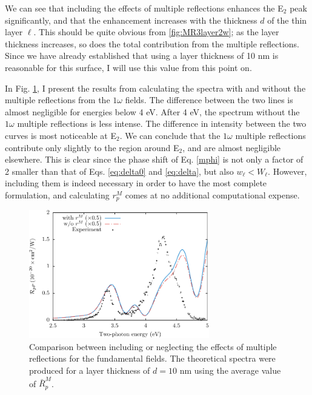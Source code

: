We can see that including the effects of multiple reflections enhances the
E$_{2}$ peak significantly, and that the enhancement increases with the
thickness $d$ of the thin layer $\ell$. This should be quite obvious from
\ref{fig:MR3layer2w}; as the layer thickness increases, so does the total
contribution from the multiple reflections. Since we have already established
that using a layer thickness of 10 nm is reasonable for this surface, I will use
this value from this point on.

In Fig. \ref{fig:mr21w}, I present the results from calculating the spectra with
and without the multiple reflections from the $1\omega$ fields. The difference
between the two lines is almost negligible for energies below 4 eV. After 4 eV,
the spectrum without the $1\omega$ multiple reflections is less intense. The
difference in intensity between the two curves is most noticeable at E$_{2}$. We
can conclude that the $1\omega$ multiple reflections contribute only slightly to
the region around E$_{2}$, and are almost negligible elsewhere. This is clear
since the phase shift of Eq. \eqref{mphi} is not only a factor of 2 smaller than
that of Eqs. \eqref{eq:delta0} and \eqref{eq:delta}, but also $w_\ell < W_\ell$.
However, including them is indeed necessary in order to have the most complete
formulation, and calculating $r^{M}_{p}$ comes at no additional computational
expense.

\begin{figure}[t]
\centering
\includegraphics[width=0.7\textwidth]{content/figures/fig-Si1x1-MRno1w}
\caption{Comparison between including or neglecting the effects of multiple
reflections for the fundamental fields. The theoretical spectra were produced
for a layer thickness of $d = 10$ nm using the average value of
$\bar{R}^{M}_{p}$.}
\label{fig:mr21w}
\end{figure}

